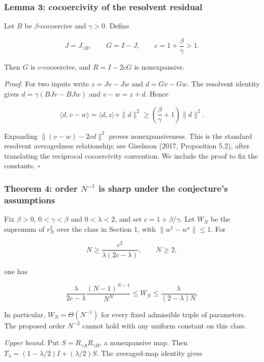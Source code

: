 \documentclass[
  british,
  11pt,
  a4paper,
]{article}
\newcounter{none} %
\begin{document}
\subsubsection{Lemma 3: cocoercivity of the resolvent
residual}\label{lemma-3-cocoercivity-of-the-resolvent-residual}

Let \(B\) be \(\beta\)-cocoercive and \(\gamma>0\). Define

\[
J=J_{\gamma B},\qquad G=I-J,\qquad
c=1+\frac{\beta}{\gamma}>1.
\tag{7}
\]

Then \(G\) is \(c\)-cocoercive, and \(R=I-2cG\) is nonexpansive.

\emph{Proof.} For two inputs write \(z=Jv-Jw\) and \(d=Gv-Gw\). The
resolvent identity gives \(d=\gamma(BJv-BJw)\) and \(v-w=z+d\). Hence

\[
\langle d,v-w\rangle
=\langle d,z\rangle+\|d\|^2
\geq\left(\frac\beta\gamma+1\right)\|d\|^2.
\]

Expanding \(\|(v-w)-2cd\|^2\) proves nonexpansiveness. This is the
standard resolvent averagedness relationship; see Giselsson (2017,
Proposition 5.2), after translating the reciprocal cocoercivity
convention. We include the proof to fix the constants. \(\square\)

\subsubsection{\texorpdfstring{Theorem 4: order \(N^{-1}\) is sharp
under the conjecture's
assumptions}{Theorem 4: order N\^{}\{-1\} is sharp under the conjecture's assumptions}}\label{theorem-4-order-n-1-is-sharp-under-the-conjectures-assumptions}

Fix \(\beta>0\), \(0<\gamma<\beta\) and \(0<\lambda<2\), and set
\(c=1+\beta/\gamma\). Let \(W_N\) be the supremum of \(r_N^2\) over the
class in Section 1, with \(\|w^1-w^\star\|\leq1\). For

\[N\geq\frac{c^2}{\lambda(2c-\lambda)},\qquad N\geq2,\]

one has

\[
\frac{\lambda}{2c-\lambda}\frac{(N-1)^{N-1}}{N^N}
\leq W_N\leq\frac{\lambda}{(2-\lambda)N}.
\tag{8}
\]

In particular, \(W_N=\Theta(N^{-1})\) for every fixed admissible triple
of parameters. The proposed order \(N^{-2}\) cannot hold with any
uniform constant on this class.

\emph{Upper bound.} Put \(S=R_{\gamma A}R_{\gamma B}\), a nonexpansive
map. Then \(T_\lambda=(1-\lambda/2)I+(\lambda/2)S\). The averaged-map
identity gives
\end{document}
